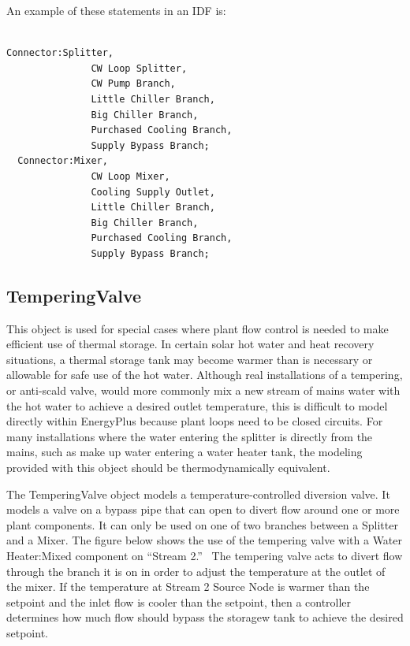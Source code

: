 An example of these statements in an IDF is:

\begin{lstlisting}

Connector:Splitter,
               CW Loop Splitter,
               CW Pump Branch,
               Little Chiller Branch,
               Big Chiller Branch,
               Purchased Cooling Branch,
               Supply Bypass Branch;
  Connector:Mixer,
               CW Loop Mixer,
               Cooling Supply Outlet,
               Little Chiller Branch,
               Big Chiller Branch,
               Purchased Cooling Branch,
               Supply Bypass Branch;
\end{lstlisting}

\subsection{TemperingValve}\label{temperingvalve}

This object is used for special cases where plant flow control is needed to make efficient use of thermal storage. In certain solar hot water and heat recovery situations, a thermal storage tank may become warmer than is necessary or allowable for safe use of the hot water. Although real installations of a tempering, or anti-scald valve, would more commonly mix a new stream of mains water with the hot water to achieve a desired outlet temperature, this is difficult to model directly within EnergyPlus because plant loops need to be closed circuits. For many installations where the water entering the splitter is directly from the mains, such as make up water entering a water heater tank, the modeling provided with this object should be thermodynamically equivalent.

The TemperingValve object models a temperature-controlled diversion valve. It models a valve on a bypass pipe that can open to divert flow around one or more plant components. It can only be used on one of two branches between a Splitter and a Mixer. The figure below shows the use of the tempering valve with a Water Heater:Mixed component on ``Stream 2.''~ The tempering valve acts to divert flow through the branch it is on in order to adjust the temperature at the outlet of the mixer. If the temperature at Stream 2 Source Node is warmer than the setpoint and the inlet flow is cooler than the setpoint, then a controller determines how much flow should bypass the storagew tank to achieve the desired setpoint.

